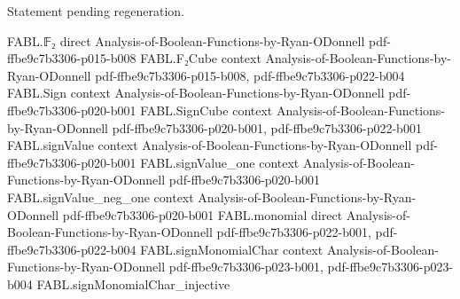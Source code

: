 \begin{theorem}
\label{FABL.eval_depthTwoFinishDifferent}
\leanok
{}
Statement pending regeneration.
\end{theorem}

\begin{theorem}
\label{FABL.eval_depthTwoFinishEqual}
\leanok
{}
\proofstep
  {FABL.𝔽₂}
  {direct}
  {Analysis-of-Boolean-Functions-by-Ryan-ODonnell}
  {pdf-ffbe9c7b3306-p015-b008}
\proofstep
  {FABL.F₂Cube}
  {context}
  {Analysis-of-Boolean-Functions-by-Ryan-ODonnell}
  {pdf-ffbe9c7b3306-p015-b008,
    pdf-ffbe9c7b3306-p022-b004}
\proofstep
  {FABL.Sign}
  {context}
  {Analysis-of-Boolean-Functions-by-Ryan-ODonnell}
  {pdf-ffbe9c7b3306-p020-b001}
\proofstep
  {FABL.SignCube}
  {context}
  {Analysis-of-Boolean-Functions-by-Ryan-ODonnell}
  {pdf-ffbe9c7b3306-p020-b001,
    pdf-ffbe9c7b3306-p022-b001}
\proofstep
  {FABL.signValue}
  {context}
  {Analysis-of-Boolean-Functions-by-Ryan-ODonnell}
  {pdf-ffbe9c7b3306-p020-b001}
\proofstep
  {FABL.signValue_one}
  {context}
  {Analysis-of-Boolean-Functions-by-Ryan-ODonnell}
  {pdf-ffbe9c7b3306-p020-b001}
\proofstep
  {FABL.signValue_neg_one}
  {context}
  {Analysis-of-Boolean-Functions-by-Ryan-ODonnell}
  {pdf-ffbe9c7b3306-p020-b001}
\proofstep
  {FABL.monomial}
  {direct}
  {Analysis-of-Boolean-Functions-by-Ryan-ODonnell}
  {pdf-ffbe9c7b3306-p022-b001,
    pdf-ffbe9c7b3306-p022-b004}
\proofstep
  {FABL.signMonomialChar}
  {context}
  {Analysis-of-Boolean-Functions-by-Ryan-ODonnell}
  {pdf-ffbe9c7b3306-p023-b001,
    pdf-ffbe9c7b3306-p023-b004}
\proofstep
  {FABL.signMonomialChar_injective}

\end{theorem}
